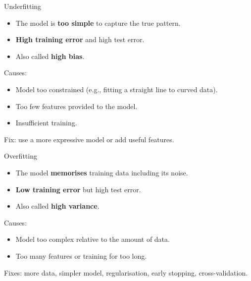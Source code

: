 \documentclass[10pt]{beamer}
\begin{document}
\begin{frame}{Underfitting}
    \begin{itemize}
        \item The model is \textbf{too simple} to capture the true pattern.
        \item \textbf{High training error} and high test error.
        \item Also called \textbf{high bias}.
    \end{itemize}
    \vspace{0.2cm}
    Causes:
    \begin{itemize}
        \item Model too constrained (e.g., fitting a straight line to curved data).
        \item Too few features provided to the model.
        \item Insufficient training.
    \end{itemize}
    \vspace{0.2cm}
    Fix: use a more expressive model or add useful features.
\end{frame}

\begin{frame}{Overfitting}
    \begin{itemize}
        \item The model \textbf{memorises} training data including its noise.
        \item \textbf{Low training error} but high test error.
        \item Also called \textbf{high variance}.
    \end{itemize}
    \vspace{0.2cm}
    Causes:
    \begin{itemize}
        \item Model too complex relative to the amount of data.
        \item Too many features or training for too long.
    \end{itemize}
    \vspace{0.2cm}
    Fixes: more data, simpler model, regularisation, early stopping, cross-validation.
\end{frame}
\end{document}
